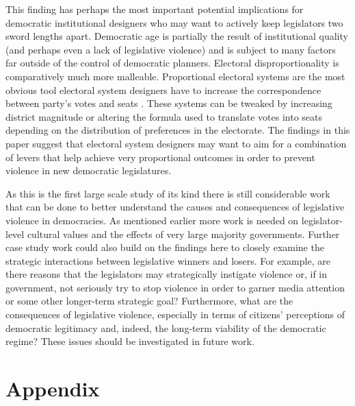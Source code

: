 \documentclass[a4paper]{article}\usepackage{graphicx, color}
\begin{document}
This finding has perhaps the most important potential implications for democratic institutional designers who may want to actively keep legislators two sword lengths apart. Democratic age is partially the result of institutional quality (and perhaps even a lack of legislative violence) and is subject to many factors far outside of the control of democratic planners. Electoral disproportionality is comparatively much more malleable. Proportional electoral systems are the most obvious tool electoral system designers have to increase the correspondence between party's votes and seats \citep{Carey2011}. These systems can be tweaked by increasing district magnitude or altering the formula used to translate votes into seats depending on the distribution of preferences in the electorate. The findings in this paper suggest that electoral system designers may want to aim for a combination of levers that help achieve very proportional outcomes in order to prevent violence in new democratic legislatures. 

As this is the first large scale study of its kind there is still considerable work that can be done to better understand the causes and consequences of legislative violence in democracies. As mentioned earlier more work is needed on legislator-level cultural values and the effects of very large majority governments. Further case study work could also build on the findings here to closely examine the strategic interactions between legislative winners and losers. For example, are there reasons that the legislators may strategically instigate violence or, if in government, not seriously try to stop violence in order to garner media attention or some other longer-term strategic goal? Furthermore, what are the consequences of legislative violence, especially in terms of citizens' perceptions of democratic legitimacy and, indeed, the long-term viability of the democratic regime? These issues should be investigated in future work. 





\theendnotes


\clearpage
\section*{Appendix}
\end{document}
